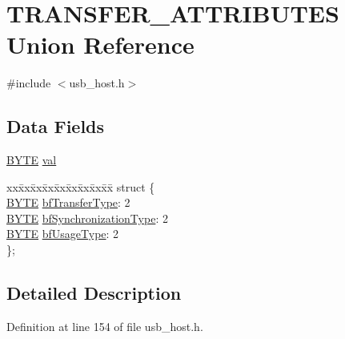 \hypertarget{union_t_r_a_n_s_f_e_r___a_t_t_r_i_b_u_t_e_s}{}\section{T\+R\+A\+N\+S\+F\+E\+R\+\_\+\+A\+T\+T\+R\+I\+B\+U\+T\+E\+S Union Reference}
\label{union_t_r_a_n_s_f_e_r___a_t_t_r_i_b_u_t_e_s}


{\ttfamily \#include $<$usb\+\_\+host.\+h$>$}

\subsection*{Data Fields}
\begin{DoxyCompactItemize}
\item 
\hyperlink{_generic_type_defs_8h_a4ae1dab0fb4b072a66584546209e7d58}{B\+Y\+T\+E} \hyperlink{union_t_r_a_n_s_f_e_r___a_t_t_r_i_b_u_t_e_s_a5986ea8162aa0f6608b36b20964044dd}{val}
\item 
\begin{tabbing}
xx\=xx\=xx\=xx\=xx\=xx\=xx\=xx\=xx\=\kill
struct \{\\
\>\hyperlink{_generic_type_defs_8h_a4ae1dab0fb4b072a66584546209e7d58}{BYTE} \hyperlink{union_t_r_a_n_s_f_e_r___a_t_t_r_i_b_u_t_e_s_a656ec7963eac8844648817d8b8e6b9b8}{bfTransferType}: 2\\
\>\hyperlink{_generic_type_defs_8h_a4ae1dab0fb4b072a66584546209e7d58}{BYTE} \hyperlink{union_t_r_a_n_s_f_e_r___a_t_t_r_i_b_u_t_e_s_a22a23afd4b446d01c9ce3c25d3f5f446}{bfSynchronizationType}: 2\\
\>\hyperlink{_generic_type_defs_8h_a4ae1dab0fb4b072a66584546209e7d58}{BYTE} \hyperlink{union_t_r_a_n_s_f_e_r___a_t_t_r_i_b_u_t_e_s_abe325c915ac512359b40cf17eb3f5dfb}{bfUsageType}: 2\\
\}; \\

\end{tabbing}\end{DoxyCompactItemize}


\subsection{Detailed Description}


Definition at line 154 of file usb\+\_\+host.\+h.



